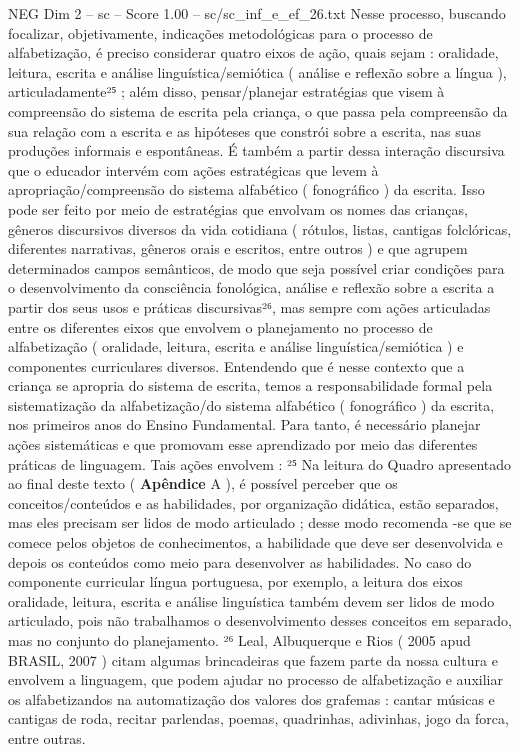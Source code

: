 \begin{textsample}{NEG Dim 2 – sc – Score 1.00 – sc/sc\_inf\_e\_ef\_26.txt}
Nesse processo, buscando focalizar, objetivamente, indicações metodológicas para o processo de alfabetização, é preciso considerar quatro eixos de ação, quais sejam : oralidade, leitura, escrita e análise linguística/semiótica ( análise e reflexão sobre a língua ), articuladamente²⁵ ; além disso, pensar/planejar estratégias que visem à compreensão do sistema de escrita pela criança, o que passa pela compreensão da sua relação com a escrita e as hipóteses que constrói sobre a escrita, nas suas produções informais e espontâneas.
É também a partir dessa interação discursiva que o educador intervém com ações estratégicas que levem à apropriação/compreensão do sistema alfabético ( fonográfico ) da escrita.
Isso pode ser feito por meio de estratégias que envolvam os nomes das crianças, gêneros discursivos diversos da vida cotidiana ( rótulos, listas, cantigas folclóricas, diferentes narrativas, gêneros orais e escritos, entre outros ) e que agrupem determinados campos semânticos, de modo que seja possível criar condições para o desenvolvimento da consciência fonológica, análise e reflexão sobre a escrita a partir dos seus usos e práticas discursivas²⁶, mas sempre com ações articuladas entre os diferentes eixos que envolvem o planejamento no processo de alfabetização ( oralidade, leitura, escrita e análise linguística/semiótica ) e componentes curriculares diversos.
Entendendo que é nesse contexto que a criança se apropria do sistema de escrita, temos a responsabilidade formal pela sistematização da alfabetização/do sistema alfabético ( fonográfico ) da escrita, nos primeiros anos do Ensino Fundamental.
Para tanto, é necessário planejar ações sistemáticas e que promovam esse aprendizado por meio das diferentes práticas de linguagem.
Tais ações envolvem : ²⁵ Na leitura do Quadro apresentado ao final deste texto ( \textbf{Apêndice} A ), é possível perceber que os conceitos/conteúdos e as habilidades, por organização didática, estão separados, mas eles precisam ser lidos de modo articulado ; desse modo recomenda -se que se comece pelos objetos de conhecimentos, a habilidade que deve ser desenvolvida e depois os conteúdos como meio para desenvolver as habilidades.
No caso do componente curricular língua portuguesa, por exemplo, a leitura dos eixos oralidade, leitura, escrita e análise linguística também devem ser lidos de modo articulado, pois não trabalhamos o desenvolvimento desses conceitos em separado, mas no conjunto do planejamento. ²⁶ Leal, Albuquerque e Rios ( 2005 apud BRASIL, 2007 ) citam algumas brincadeiras que fazem parte da nossa cultura e envolvem a linguagem, que podem ajudar no processo de alfabetização e auxiliar os alfabetizandos na automatização dos valores dos grafemas : cantar músicas e cantigas de roda, recitar parlendas, poemas, quadrinhas, adivinhas, jogo da forca, entre outras.

\end{textsample}
